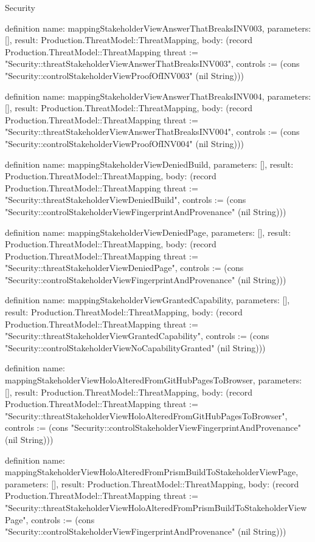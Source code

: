 \begin{lexlean}{Security}
\begin{semanticmodule}
definition{
  name: mappingStakeholderViewAnswerThatBreaksINV003,
  parameters: [],
  result: Production.ThreatModel::ThreatMapping,
  body: (record Production.ThreatModel::ThreatMapping {threat := "Security::threatStakeholderViewAnswerThatBreaksINV003", controls := (cons "Security::controlStakeholderViewProofOfINV003" (nil String))})
}

definition{
  name: mappingStakeholderViewAnswerThatBreaksINV004,
  parameters: [],
  result: Production.ThreatModel::ThreatMapping,
  body: (record Production.ThreatModel::ThreatMapping {threat := "Security::threatStakeholderViewAnswerThatBreaksINV004", controls := (cons "Security::controlStakeholderViewProofOfINV004" (nil String))})
}

definition{
  name: mappingStakeholderViewDeniedBuild,
  parameters: [],
  result: Production.ThreatModel::ThreatMapping,
  body: (record Production.ThreatModel::ThreatMapping {threat := "Security::threatStakeholderViewDeniedBuild", controls := (cons "Security::controlStakeholderViewFingerprintAndProvenance" (nil String))})
}

definition{
  name: mappingStakeholderViewDeniedPage,
  parameters: [],
  result: Production.ThreatModel::ThreatMapping,
  body: (record Production.ThreatModel::ThreatMapping {threat := "Security::threatStakeholderViewDeniedPage", controls := (cons "Security::controlStakeholderViewFingerprintAndProvenance" (nil String))})
}

definition{
  name: mappingStakeholderViewGrantedCapability,
  parameters: [],
  result: Production.ThreatModel::ThreatMapping,
  body: (record Production.ThreatModel::ThreatMapping {threat := "Security::threatStakeholderViewGrantedCapability", controls := (cons "Security::controlStakeholderViewNoCapabilityGranted" (nil String))})
}

definition{
  name: mappingStakeholderViewHoloAlteredFromGitHubPagesToBrowser,
  parameters: [],
  result: Production.ThreatModel::ThreatMapping,
  body: (record Production.ThreatModel::ThreatMapping {threat := "Security::threatStakeholderViewHoloAlteredFromGitHubPagesToBrowser", controls := (cons "Security::controlStakeholderViewFingerprintAndProvenance" (nil String))})
}

definition{
  name: mappingStakeholderViewHoloAlteredFromPrismBuildToStakeholderViewPage,
  parameters: [],
  result: Production.ThreatModel::ThreatMapping,
  body: (record Production.ThreatModel::ThreatMapping {threat := "Security::threatStakeholderViewHoloAlteredFromPrismBuildToStakeholderViewPage", controls := (cons "Security::controlStakeholderViewFingerprintAndProvenance" (nil String))})
}


\end{semanticmodule}
\end{lexlean}
